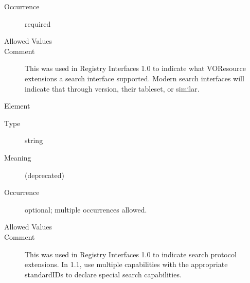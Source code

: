 \documentclass{ivoa}
\begin{document}
\begin{generated}
\begin{bigdescription}
\begin{description}
\item[Occurrence] required

\item[Allowed Values]\hfil
{}
\item[Comment] 
                     	This was used in Registry Interfaces 1.0 to indicate
                     	what VOResource extensions a search interface supported.
                     	Modern search interfaces will indicate that through
                     	version, their tableset, or similar.
                     

\end{description}
\item[Element \xmlel{optionalProtocol}]
\begin{description}
\item[Type] string
\item[Meaning] 
                       (deprecated)
                     
\item[Occurrence] optional; multiple occurrences allowed.

\item[Allowed Values]\hfil
{}
\item[Comment] 
                       This was used in Registry Interfaces 1.0 to indicate
                       search protocol extensions.  In 1.1, use multiple
                       capabilities with the appropriate standardIDs
                       to declare special search capabilities.
                     

\end{description}


\end{bigdescription}\endgroup

\endgroup
\end{generated}
\end{document}

